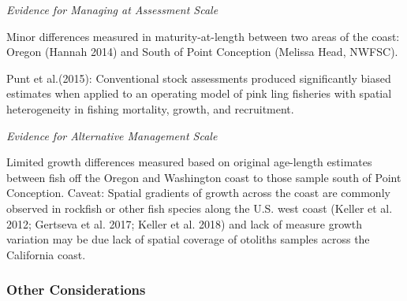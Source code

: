 \documentclass[11pt,
  english,
  a4paper,
]{article}
\begin{document}
\emph{Evidence for Managing at Assessment Scale}

\leavevmode\tagmcend\tagstructend\par


Minor differences measured in maturity-at-length between two areas of the coast: Oregon {(Hannah 2014)\leavevmode\tagmcend\tagstructend} and South of Point Conception (Melissa Head, NWFSC).

\leavevmode\tagmcend\tagstructend\par


Punt et al.{(2015)\leavevmode\tagmcend\tagstructend}: Conventional stock assessments produced significantly biased estimates when applied to an operating model of pink ling fisheries with spatial heterogeneity in fishing mortality, growth, and recruitment.

\leavevmode\tagmcend\tagstructend\par


\emph{Evidence for Alternative Management Scale}

\leavevmode\tagmcend\tagstructend\par


Limited growth differences measured based on original age-length estimates between fish off the Oregon and Washington coast to those sample south of Point Conception. Caveat: Spatial gradients of growth across the coast are commonly observed in rockfish or other fish species along the U.S. west coast {(Keller et al. 2012; Gertseva et al. 2017; Keller et al. 2018)\leavevmode\tagmcend\tagstructend} and lack of measure growth variation may be due lack of spatial coverage of otoliths samples across the California coast.

\leavevmode\tagmcend\tagstructend\par


\hypertarget{other-considerations}{%
\subsubsection{Other Considerations}\label{other-considerations}}
\end{document}

